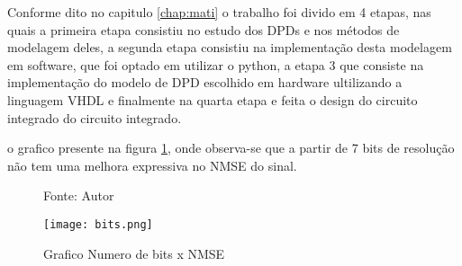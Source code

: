 Conforme dito no capitulo \ref{chap:mati} o trabalho foi divido em 4 etapas, nas quais a primeira etapa consistiu no estudo dos DPDs e nos métodos de modelagem deles, a segunda etapa consistiu na implementação desta modelagem em software, que foi optado em utilizar o python, a etapa 3 que consiste na implementação do modelo de DPD escolhido em hardware ultilizando a linguagem VHDL e finalmente na quarta etapa e feita o design do circuito integrado do circuito integrado.

o grafico presente na figura \ref{fig:bits}, onde observa-se que a partir de 7 bits de resolução não tem uma melhora expressiva no NMSE do sinal.

\begin{figure}[ht!]
    \centering
    \captionsetup{justification=centering}
    \caption*{Fonte: Autor}
    \texttt{[image: bits.png]}
    \caption{Grafico Numero de bits x NMSE}
    \label{fig:bits}
\end{figure}
